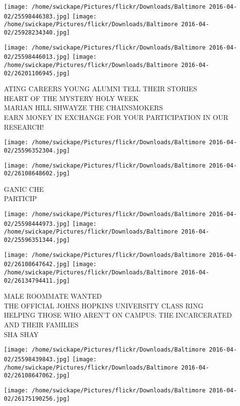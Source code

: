 \documentclass[10pt,letterpaper]{article}
\begin{document}
\texttt{[image: /home/swickape/Pictures/flickr/Downloads/Baltimore 2016-04-02/25598446383.jpg]}
\texttt{[image: /home/swickape/Pictures/flickr/Downloads/Baltimore 2016-04-02/25928234340.jpg]}

\texttt{[image: /home/swickape/Pictures/flickr/Downloads/Baltimore 2016-04-02/25598446013.jpg]}
\texttt{[image: /home/swickape/Pictures/flickr/Downloads/Baltimore 2016-04-02/26201106945.jpg]}

ATING CAREERS YOUNG ALUMNI TELL THEIR STORIES\\
HEART OF THE MYSTERY HOLY WEEK\\
MARIAN HILL SHWAYZE THE CHAINSMOKERS\\
EARN MONEY IN EXCHANGE FOR YOUR PARTICIPATION IN OUR RESEARCH!
\pagebreak

\texttt{[image: /home/swickape/Pictures/flickr/Downloads/Baltimore 2016-04-02/25596352304.jpg]}

\vspace{0.25in}
\texttt{[image: /home/swickape/Pictures/flickr/Downloads/Baltimore 2016-04-02/26108648602.jpg]}

GANIC CHE\\
PARTICIP
\pagebreak

\texttt{[image: /home/swickape/Pictures/flickr/Downloads/Baltimore 2016-04-02/25598444973.jpg]}
\texttt{[image: /home/swickape/Pictures/flickr/Downloads/Baltimore 2016-04-02/25596351344.jpg]}

\texttt{[image: /home/swickape/Pictures/flickr/Downloads/Baltimore 2016-04-02/26108647642.jpg]}
\texttt{[image: /home/swickape/Pictures/flickr/Downloads/Baltimore 2016-04-02/26134794411.jpg]}

MALE ROOMMATE WANTED\\
THE OFFICIAL JOHNS HOPKINS UNIVERSITY CLASS RING\\
HELPING THOSE WHO AREN'T ON CAMPUS: THE INCARCERATED AND THEIR FAMILIES\\
SHA SHAY
\pagebreak

\texttt{[image: /home/swickape/Pictures/flickr/Downloads/Baltimore 2016-04-02/25598439843.jpg]}
\texttt{[image: /home/swickape/Pictures/flickr/Downloads/Baltimore 2016-04-02/26108647062.jpg]}

\vspace{0.25in}
\texttt{[image: /home/swickape/Pictures/flickr/Downloads/Baltimore 2016-04-02/26175190256.jpg]}
\end{document}

